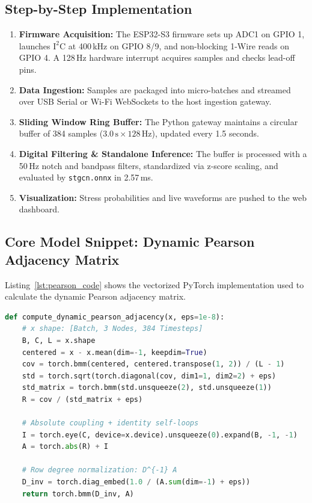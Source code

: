 \documentclass[11pt,a4paper]{article}
\begin{document}
\subsection{Step-by-Step Implementation}
\begin{enumerate}
    \item \textbf{Firmware Acquisition:} The ESP32-S3 firmware sets up ADC1 on GPIO 1, launches $\text{I}^2\text{C}$ at 400\,kHz on GPIO 8/9, and non-blocking 1-Wire reads on GPIO 4. A 128\,Hz hardware interrupt acquires samples and checks lead-off pins.
    \item \textbf{Data Ingestion:} Samples are packaged into micro-batches and streamed over USB Serial or Wi-Fi WebSockets to the host ingestion gateway.
    \item \textbf{Sliding Window Ring Buffer:} The Python gateway maintains a circular buffer of 384 samples ($3.0\,\text{s} \times 128\,\text{Hz}$), updated every 1.5 seconds.
    \item \textbf{Digital Filtering \& Standalone Inference:} The buffer is processed with a 50\,Hz notch and bandpass filters, standardized via z-score scaling, and evaluated by \texttt{stgcn.onnx} in 2.57\,ms.
    \item \textbf{Visualization:} Stress probabilities and live waveforms are pushed to the web dashboard.
\end{enumerate}

\subsection{Core Model Snippet: Dynamic Pearson Adjacency Matrix}
Listing~\ref{lst:pearson_code} shows the vectorized PyTorch implementation used to calculate the dynamic Pearson adjacency matrix.

\begin{lstlisting}[language=Python, caption={Vectorized Dynamic Pearson Adjacency Formulation.}, label={lst:pearson_code}]
def compute_dynamic_pearson_adjacency(x, eps=1e-8):
    # x shape: [Batch, 3 Nodes, 384 Timesteps]
    B, C, L = x.shape
    centered = x - x.mean(dim=-1, keepdim=True)
    cov = torch.bmm(centered, centered.transpose(1, 2)) / (L - 1)
    std = torch.sqrt(torch.diagonal(cov, dim1=1, dim2=2) + eps)
    std_matrix = torch.bmm(std.unsqueeze(2), std.unsqueeze(1))
    R = cov / (std_matrix + eps)
    
    # Absolute coupling + identity self-loops
    I = torch.eye(C, device=x.device).unsqueeze(0).expand(B, -1, -1)
    A = torch.abs(R) + I
    
    # Row degree normalization: D^{-1} A
    D_inv = torch.diag_embed(1.0 / (A.sum(dim=-1) + eps))
    return torch.bmm(D_inv, A)
\end{lstlisting}
\end{document}
